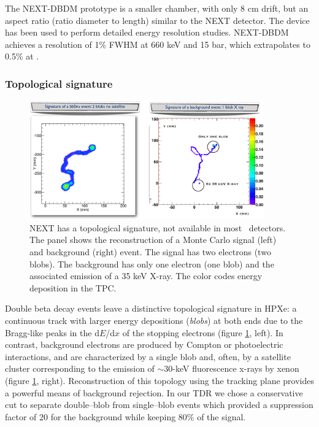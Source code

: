 The NEXT-DBDM prototype is a smaller chamber, with only 8 cm drift, but an aspect ratio (ratio diameter to length) similar to the NEXT detector. The device has been used to perform detailed energy resolution studies. NEXT-DBDM achieves a resolution of 1\% FWHM at 660 keV and 15 bar, which extrapolates to 0.5\% at \Qbb.

\subsubsection*{Topological signature}

\begin{figure}
\centering
\includegraphics[width=0.9\textwidth]{img/ETRK2.pdf}
\caption{\small NEXT has a topological signature, not available in most \bbonu\ detectors. The panel shows the reconstruction of a Monte Carlo signal (left) and background (right) event. The signal has two electrons (two blobs). The background has only one electron (one blob) and the associated emission of a 35 keV X-ray. The color codes energy deposition in the TPC.}\label{fig.ETRK2}
\end{figure}
	
Double beta decay events leave a distinctive topological signature in HPXe: a continuous track with larger energy depositions (\emph{blobs}) at both ends due to the Bragg-like peaks in the d$E$/d$x$ of the stopping electrons (figure \ref{fig.ETRK2}, left). In contrast, background electrons are produced by Compton or photoelectric interactions, and are characterized by a single blob and, often, by a satellite cluster corresponding to the emission of $\sim30$-keV fluorescence x-rays by xenon (figure \ref{fig.ETRK2}, right).
Reconstruction of this topology using the tracking plane provides a powerful means of background rejection. In our TDR we chose a conservative cut to separate double--blob from single--blob events which provided a suppression factor of 20 for the background while keeping 80\% of the signal.  

